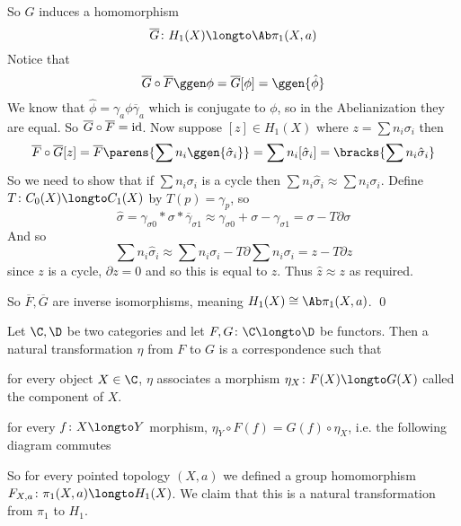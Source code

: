 So $G$ induces a homomorphism
$$ \overline G\colon H_1(X)\longto\Ab\pi_1(X,a) $$
Notice that
$$ \overline G\circ\overline F\ggen\phi = \overline G[\phi] = \ggen{\hat\phi} $$
We know that $\hat\phi=\gamma_a\phi\overline\gamma_a$ which is conjugate to $\phi$, so in the Abelianization they are equal.
So $\overline G\circ\overline F={\rm id}$.
Now suppose $[z]\in H_1(X)$ where $z=\sum n_i\sigma_i$ then
$$ \overline F\circ\overline G[z] = \overline F\parens{\sum n_i\ggen{\hat\sigma_i}} = \sum n_i[\hat\sigma_i] = \bracks{\sum n_i\hat\sigma_i} $$
So we need to show that if $\sum n_i\sigma_i$ is a cycle then $\sum n_i\hat\sigma_i\approx\sum n_i\sigma_i$.
Define $T\colon C_0(X)\longto C_1(X)$ by $T(p)=\gamma_p$, so
$$ \hat\sigma = \gamma_{\sigma0}*\sigma*\overline\gamma_{\sigma1} \approx \gamma_{\sigma0} + \sigma - \gamma_{\sigma1} = \sigma - T\partial\sigma $$
And so
$$ \sum n_i\hat\sigma_i \approx \sum n_i\sigma_i - T\partial\sum n_i\sigma_i = z - T\partial z $$
since $z$ is a cycle, $\partial z=0$ and so this is equal to $z$.
Thus $\hat z\approx z$ as required.

So $\overline F,\overline G$ are inverse isomorphisms, meaning $H_1(X)\cong\Ab\pi_1(X,a)$.
\qed

\bdefn

    Let $\C,\D$ be two categories and let $F,G\colon\C\longto\D$ be functors.
    Then a {\emphcolor natural transformation} $\eta$ from $F$ to $G$ is a correspondence such that
    \benum
        \item for every object $X\in\C$, $\eta$ associates a morphism $\eta_X\colon F(X)\longto G(X)$ called the {\emphcolor component} of $X$.
        \item for every $f\colon X\longto Y$ morphism, $\eta_Y\circ F(f)=G(f)\circ\eta_X$, i.e. the following diagram commutes

            \bigskip
            \centerline{\def\diagrowheight{1cm}}
    \eenum

\edefn

So for every pointed topology $(X,a)$ we defined a group homomorphism $F_{X,a}\colon\pi_1(X,a)\longto H_1(X)$.
We claim that this is a natural transformation from $\pi_1$ to $H_1$.

